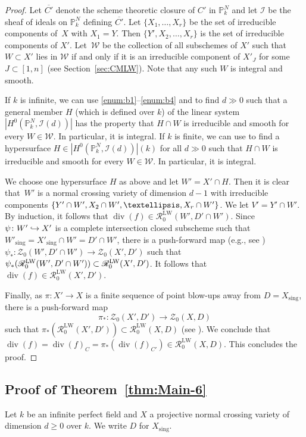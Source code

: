 \documentclass[11pt]{article}
\numberwithin{equation}{section}
\let\mathcal\mathscr
\def\hto{\mathrel{\lhook\joinrel\to}}
\let\inj\hto
\newcommand{\LW}{\mathrm{LW}}
\theoremstyle{definition}
\newcommand{\thmref}{Theorem~\ref}
\newcommand{\secref}{Section~\ref}
\newcommand{\sI}{{\mathcal I}}
\newcommand{\sR}{{\mathcal R}}
\newcommand{\sW}{{\mathcal W}}
\newcommand{\sZ}{{\mathcal Z}}
\renewcommand{\P}{{\mathbb P}}
\DeclareMathOperator{\divf}{div}
\newcommand{\sing}{\mathrm{sing}}
\let\ov\overline
\begin{document}
\begin{proof}
Let $\ov{C'}$ denote the scheme theoretic closure of $C'$ in $\P^N_k$ and let
$\sI$ be the sheaf of ideals on $\P^N_k$ defining $\ov{C'}$.
Let $\{X_1, \ldots , X_r\}$ be the set of irreducible components of~$X$
with $X_1 = Y$. Then $\{Y', X_2, \ldots , X_r\}$ is the set of irreducible
components of $X'$.
Let~$\sW$ be the collection of all subschemes of $X'$ such that
$W \subset X'$ lies in $\sW$ if and only if it is an irreducible component
of $X'_J$ for some $J \subset [1,n]$ (see \secref{sec:CMLW}).
Note that any such $W$ is integral and smooth.

If $k$ is infinite, we can use \eqref{enum:b1}--\eqref{enum:b4} and \cite[Th.\,3.12]{GK} to
find $d \gg 0$ such that a general member $H$ (which is defined over $k$) of
the linear system $|H^0(\P^N_k, \sI(d))|$ has the property that
$H \cap W$ is irreducible and smooth for every $W \in \sW$.
In particular, it is integral.
If $k$ is finite, we can use \cite[Prop.\,5.2, Th.\,8.4]{GK} to find a
hypersurface $H \in |H^0(\P^N_k, \sI(d))|(k)$ for all $d \gg 0$ such that
$H \cap W$ is irreducible and smooth for every $W \in \sW$.
In particular, it is integral.

We choose one hypersurface $H$ as above and let $W' = X' \cap H$. Then
it is clear that~$W'$ is a normal crossing variety of dimension $d-1$ with irreducible
components $\{Y' \cap\nobreak W', X_2 \cap W', \ldots , X_r \cap W'\}$.
We let $V' = Y' \cap W'$.
By induction, it follows that $\divf(f) \in \sR^{\LW}_0(W', D' \cap W')$.
Since $\psi \colon W' \inj X'$ is a complete intersection closed subscheme
such that $W'_{\sing} = X'_{\sing} \cap W' = D' \cap W'$, there is a
push-forward map (e.g., see \cite[Lem.\,3.10]{BK})
$\psi_* \colon \sZ_0(W', D' \cap W') \to \sZ_0(X',D')$
such that $\psi_*(\sR^{\LW}_0(W', D' \cap\nobreak W')) \subset \sR^{\LW}_0(X',D')$.
It follows that $\divf(f) \in \sR^{\LW}_0(X',D')$.

Finally, as $\pi \colon X' \to X$ is a finite sequence of point blow-ups away
from $D = X_{\sing}$,
there is a push-forward map
\[
\pi_* \colon \sZ_0(X', D') \to \sZ_0(X,D)
\]
such that $\pi_*(\sR^{\LW}_0(X', D')) \subset \sR^{\LW}_0(X,D)$
(see \cite[Lem.\,3.18]{BK}). We conclude that
$\divf(f) = \divf(f)_C = \pi_*(\divf(f)_{C'}) \in
\sR^{\LW}_0(X,D)$. This concludes the proof.
\end{proof}

\subsection{Proof of \thmref{thm:Main-6}}\label{sec:Final}
Let $k$ be an infinite perfect field
and $X$ a projective normal crossing variety of dimension $d \ge 0$ over $k$.
We write $D$ for $X_\sing$.
\end{document}
